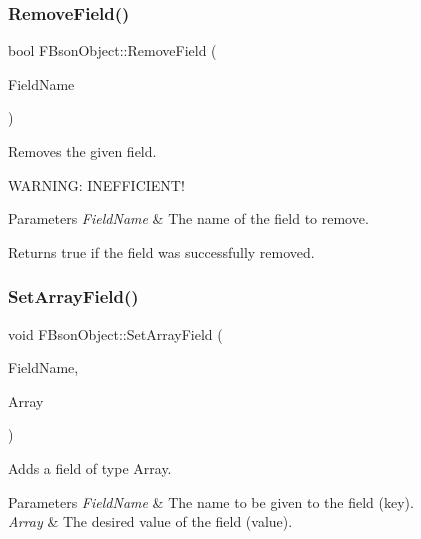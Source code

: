 \subsubsection{\texorpdfstring{Remove\+Field()}{RemoveField()}}
{\footnotesize\ttfamily bool F\+Bson\+Object\+::\+Remove\+Field (\begin{DoxyParamCaption}\item[{const F\+String \&}]{Field\+Name }\end{DoxyParamCaption})}

Removes the given field.

W\+A\+R\+N\+I\+NG\+: I\+N\+E\+F\+F\+I\+C\+I\+E\+N\+T!


\begin{DoxyParams}{Parameters}
{\em Field\+Name} & The name of the field to remove. \\
\hline
\end{DoxyParams}
\begin{DoxyReturn}{Returns}
true if the field was successfully removed. 
\end{DoxyReturn}
\mbox{\label{class_f_bson_object_a82b1c8b61a1d4236dd0b4a6b31a6eea7}} 
\subsubsection{\texorpdfstring{Set\+Array\+Field()}{SetArrayField()}}
{\footnotesize\ttfamily void F\+Bson\+Object\+::\+Set\+Array\+Field (\begin{DoxyParamCaption}\item[{const F\+String \&}]{Field\+Name,  }\item[{const T\+Array$<$ T\+Shared\+Ptr$<$ \mbox{\hyperlink{class_f_bson_value}{F\+Bson\+Value}} $>$ $>$ \&}]{Array }\end{DoxyParamCaption})}

Adds a field of type Array.


\begin{DoxyParams}{Parameters}
{\em Field\+Name} & The name to be given to the field (key). \\
\hline
{\em Array} & The desired value of the field (value). \\
\hline
\end{DoxyParams}
\mbox{\label{class_f_bson_object_a68e5a109c8efba903375686cbffbcd7f}} 
